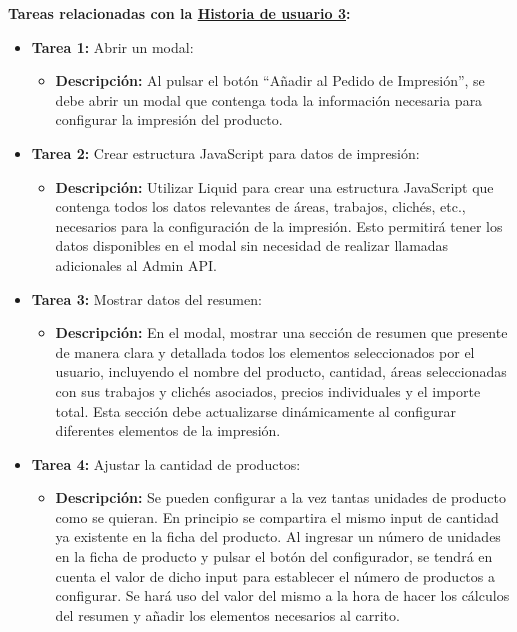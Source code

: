 \documentclass[11pt]{article}
\begin{document}
\textbf{Tareas relacionadas con la \hyperref[sec:historia3]{Historia de usuario 3}:}
\begin{itemize}
    \item \textbf{Tarea 1:} Abrir un modal:
          \begin{itemize}[label=--]
              \item \textbf{Descripción:} Al pulsar el botón ``Añadir al Pedido de Impresión'', se debe abrir un modal que contenga toda la información necesaria para configurar la impresión del producto.
          \end{itemize}
    \item \textbf{Tarea 2:} Crear estructura JavaScript para datos de impresión:
          \begin{itemize}[label=--]
              \item \textbf{Descripción:} Utilizar Liquid para crear una estructura JavaScript que contenga todos los datos relevantes de áreas, trabajos, clichés, etc., necesarios para la configuración de la impresión. Esto permitirá tener los datos disponibles en el modal sin necesidad de realizar llamadas adicionales al Admin API.
          \end{itemize}
    \item \textbf{Tarea 3:} Mostrar datos del resumen:
          \begin{itemize}[label=--]
              \item \textbf{Descripción:} En el modal, mostrar una sección de resumen que presente de manera clara y detallada todos los elementos seleccionados por el usuario, incluyendo el nombre del producto, cantidad, áreas seleccionadas con sus trabajos y clichés asociados, precios individuales y el importe total. Esta sección debe actualizarse dinámicamente al configurar diferentes elementos de la impresión.
          \end{itemize}
    \item \textbf{Tarea 4:} Ajustar la cantidad de productos:
          \begin{itemize}[label=--]
              \item \textbf{Descripción:} Se pueden configurar a la vez tantas unidades de producto como se quieran. En principio se compartira el mismo input de cantidad ya existente en la ficha del producto. Al ingresar un número de unidades en la ficha de producto y pulsar el botón del configurador, se tendrá en cuenta el valor de dicho input para establecer el número de productos a configurar. Se hará uso del valor del mismo a la hora de hacer los cálculos del resumen y añadir los elementos necesarios al carrito.

\end{itemize}
\end{itemize}
\end{document}
